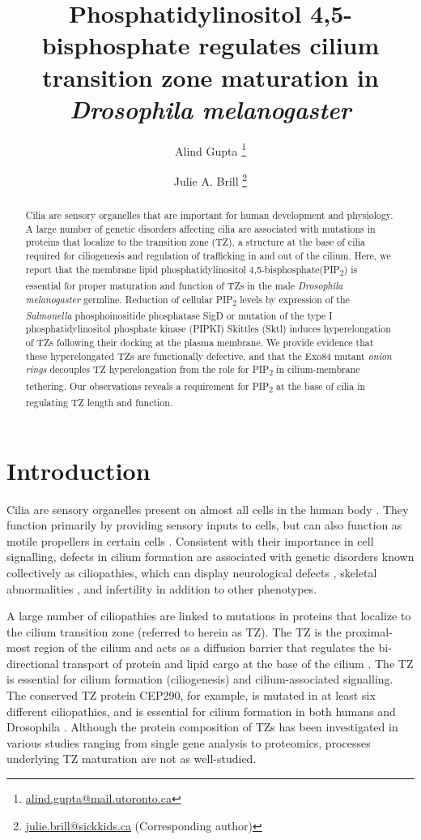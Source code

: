 \documentclass[12pt, twoside, letterpaper]{article}
\title{\bfseries\large Phosphatidylinositol 4,5-bisphosphate regulates cilium transition zone maturation in \textit{Drosophila melanogaster}}
\author[1,2]{Alind Gupta \thanks{\url{alind.gupta@mail.utoronto.ca}}}
\author[1,2]{Julie A. Brill \thanks{\url{julie.brill@sickkids.ca} (Corresponding author)}}
\affil[1]{\small Department of Molecular Genetics, University of Toronto, Toronto, ON M5S 1A8, Canada}
\affil[2]{\small Program in Cell Biology, Hospital for Sick Children, Toronto, ON M5G 1X8, Canada}
\date{}
\newcommand{\PIP}{PIP\textsubscript{2}}
\begin{document}
\maketitle
\raggedright

\begin{abstract}
  \vspace*{-0.7em}
  Cilia are sensory organelles that are important for human development
  and physiology.
  A large number of genetic disorders affecting cilia are associated with
  mutations in proteins that localize to the transition zone (TZ),
  a structure at the base of cilia required for ciliogenesis and
  regulation of trafficking in and out of the cilium.
  Here, we report that the membrane lipid phosphatidylinositol
  4,5-bisphosphate(\PIP{}) is essential for proper maturation and function
  of TZs in the male \textit{Drosophila melanogaster} germline.
  Reduction of cellular \PIP{} levels by expression of the
  \textit{Salmonella} phosphoinositide phosphatase SigD or mutation of
  the type I phosphatidylinositol phosphate kinase (PIPKI) Skittles (Sktl)
  induces hyperelongation of TZs following their docking at the plasma
  membrane.
  We provide evidence that these hyperelongated TZs are functionally
  defective, and that the Exo84 mutant \textit{onion rings} decouples
  TZ hyperelongation from the role for \PIP{} in cilium-membrane
  tethering.
  Our observations reveals a requirement for \PIP{} at the base of cilia
  in regulating TZ length and function.
\end{abstract}


\section{Introduction}
Cilia are sensory organelles present on almost all cells in the human body
\citep{satir2010primary}.
They function primarily by providing sensory inputs to cells, but can
also function as motile propellers in certain cells
\citep{bloodgood2010sensory}.
Consistent with their importance in cell signalling,
defects in cilium formation are associated with genetic disorders
known collectively as ciliopathies, which can display
neurological defects \citep{valente2014primary},
skeletal abnormalities \citep{hammarsjo2017novel, waters2011ciliopathies},
and infertility \citep{inaba2016sperm} in addition to other phenotypes.

A large number of ciliopathies are linked to mutations in proteins that
localize to the cilium transition zone (referred to herein as TZ).
The TZ is the proximal-most region of the cilium and
acts as a diffusion barrier that regulates the
bi-directional transport of protein and lipid cargo at the base of the cilium
\citep{reiter2012base, szymanska2012transition}.
The TZ is essential for cilium formation (ciliogenesis) and cilium-associated
signalling.
The conserved TZ protein CEP290, for example, is mutated in at least
six different ciliopathies, and is essential for cilium formation in both humans
and Drosophila \citep{basiri2014migrating}.
Although the protein composition of TZs has been investigated in various
studies ranging from single gene analysis to proteomics,
processes underlying TZ maturation are not as well-studied.
\end{document}
